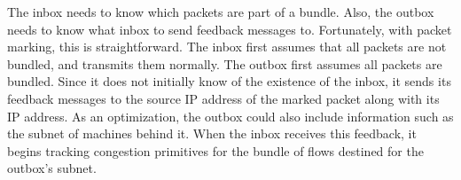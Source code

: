 \begin{outline}
        \3 The inbox needs to know which packets are part of a bundle.
    \2 Also, the outbox needs to know what inbox to send feedback messages to.
    \2 Fortunately, with packet marking, this is straightforward. The inbox first assumes that all packets are not bundled, and transmits them normally.
    \2 The outbox first assumes all packets are bundled. Since it does not initially know of the existence of the inbox, it sends its feedback messages to the source IP address of the marked packet along with its IP address. As an optimization, the outbox could also include information such as the subnet of machines behind it.
        \3 When the inbox receives this feedback, it begins tracking congestion primitives for the bundle of flows destined for the outbox's subnet.
\end{outline}